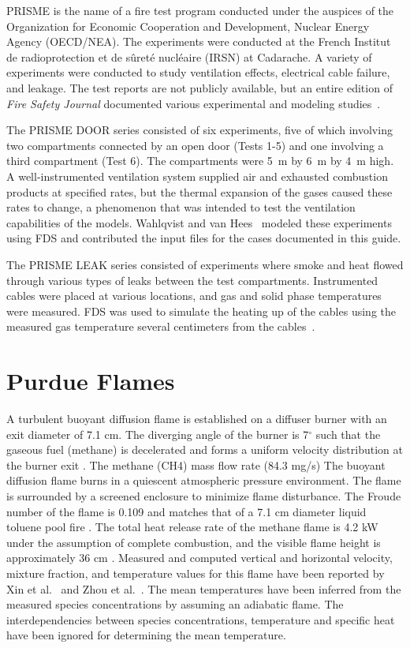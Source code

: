 PRISME is the name of a fire test program conducted under the auspices of the Organization for Economic Cooperation and Development, Nuclear Energy Agency (OECD/NEA). The experiments were conducted at the French Institut de radioprotection et de s\^{u}ret\'{e} nucl\'{e}aire (IRSN) at Cadarache. A variety of experiments were conducted to study ventilation effects, electrical cable failure, and leakage. The test reports are not publicly available, but an entire edition of {\em Fire Safety Journal} documented various experimental and modeling studies~\cite{Audouin:FSJ}.

The PRISME DOOR series consisted of six experiments, five of which involving two compartments connected by an open door (Tests 1-5) and one involving a third compartment (Test 6). The compartments were 5~m by 6~m by 4~m high. A well-instrumented ventilation system supplied air and exhausted combustion products at specified rates, but the thermal expansion of the gases caused these rates to change, a phenomenon that was intended to test the ventilation capabilities of the models. Wahlqvist and van Hees~\cite{Wahlqvist:FSJ} modeled these experiments using FDS and contributed the input files for the cases documented in this guide.

The PRISME LEAK series consisted of experiments where smoke and heat flowed through various types of leaks between the test compartments. Instrumented cables were placed at various locations, and gas and solid phase temperatures were measured. FDS was used to simulate the heating up of the cables using the measured gas temperature several centimeters from the cables~\cite{Dreisbach:Interflam}.

\section{Purdue Flames}
\label{Purdue_Flames_Description}

A turbulent buoyant diffusion flame is established on a diffuser burner with an exit diameter of 7.1 cm. The diverging angle of the burner is 7$^\circ$ such that the gaseous fuel (methane) is decelerated and forms a uniform velocity distribution at the burner exit \cite{Xin:CF2005}. The methane (CH4) mass flow rate (84.3 mg/s) The buoyant diffusion flame burns in a quiescent atmospheric pressure environment. The flame is surrounded by a screened enclosure to minimize flame disturbance. The Froude number of the flame is 0.109 and matches that of a 7.1 cm diameter liquid toluene pool fire \cite{Xin:CF2005,Zhou:CS1998}. The total heat release rate of the methane flame is 4.2 kW under the assumption of complete combustion, and the visible flame height is approximately 36 cm \cite{Xin:CF2005}. Measured and computed vertical and horizontal velocity, mixture fraction, and temperature values for this flame have been reported by Xin et al.~\cite{Xin:CF2005,Xin:PhD2002} and Zhou et al.~\cite{Zhou:CS1998,Zhou:PurduePhD1999}. The mean temperatures have been inferred from the measured species concentrations \cite{Xin:CF2005} by assuming an adiabatic flame. The interdependencies between species concentrations, temperature and specific heat have been ignored for determining the mean temperature.

